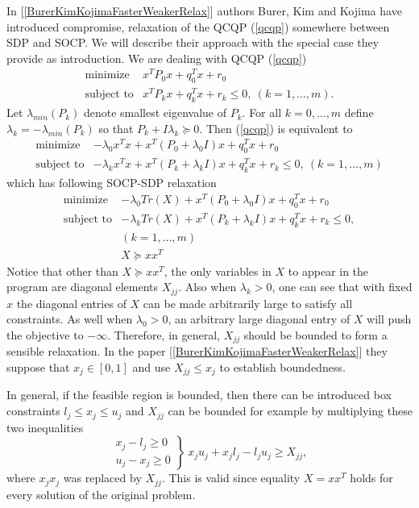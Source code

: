 \documentclass[12pt]{book}
\theoremstyle{definition}
\begin{document}
In [\ref{BurerKimKojimaFasterWeakerRelax}] authors Burer, Kim and Kojima have introduced compromise, relaxation of the QCQP (\ref{qcqp}) somewhere between SDP and SOCP. We will describe their approach with the special case they provide as introduction.
We are dealing with QCQP (\ref{qcqp})
\begin{equation}
\label{mixedSOCPSDP_begining qcqp}
\begin{array}{ll}
\mbox{minimize}& x^TP_0x + q_0^Tx + r_0 \\
\mbox{subject to}& x^TP_kx + q_k^Tx + r_k \leq 0, \  (k = 1,\dots ,m).
\end{array} 
\end{equation}
Let  $\lambda_{min}(P_k)$ denote smallest eigenvalue of $P_k$.
For all $k=0,\dots ,m$ define $\lambda_k=-\lambda_{min}(P_k)$ so that $P_k + I\lambda_k\succeq 0$. Then (\ref{qcqp}) is equivalent to 
\begin{equation}
\begin{array}{ll}
\mbox{minimize}& -\lambda_0 x^Tx +  x^T(P_0+\lambda_0 I)x + q_0^Tx + r_0\\
\mbox{subject to}& -\lambda_kx^Tx +  x^T(P_k+\lambda_kI)x + q_k^Tx + r_k \leq 0, \  (k = 1,\dots ,m)
\end{array} 
\end{equation}
which has following SOCP-SDP relaxation
\begin{equation}
\label{InBetweenSOCPSDP1}
\begin{array}{ll}
\mbox{minimize}& -\lambda_0 Tr(X) +  x^T(P_0+\lambda_0 I)x + q_0^Tx +r_0 \\
\mbox{subject to}& -\lambda_k Tr(X) +  x^T(P_k+\lambda_kI)x + q_k^Tx + r_k \leq 0, \\  
&(k = 1,\dots ,m) \\
& X\succeq xx^T
\end{array} 
\end{equation}
Notice that other than $X\succeq xx^T$, the only variables in $X$ to appear in the program are diagonal elements $X_{jj}$.
Also when $\lambda_k>0$, one can see that with fixed $x$ the diagonal entries of $X$ can be made arbitrarily large to satisfy all constraints. As well when $\lambda_0>0$, an arbitrary large diagonal entry of $X$ will push the objective to $-\infty .$ Therefore, in general, $X_{jj}$ should be bounded to form a sensible relaxation. In the paper [\ref{BurerKimKojimaFasterWeakerRelax}] they suppose that $x_j\in [0,1]$ and use $X_{jj}\leq x_j$ to establish boundedness. 

\rem In general, if the feasible region is bounded, then there can be introduced box constraints $l_j\leq x_j \leq u_j$ and $X_{jj}$ can be bounded for example by multiplying these two inequalities 
\begin{equation}
\left.\begin{array}{r}
x_j - l_j \geq 0\\
u_j - x_j \geq 0
\end{array}\right\rbrace \
x_ju_j + x_jl_j - l_ju_j \geq X_{jj},
\end{equation} 
where $x_jx_j$ was replaced by $X_{jj}$. This is valid since equality $X = xx^T$ holds for every solution of the original problem. 
\medskip
\end{document}

